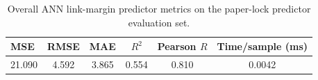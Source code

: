 \begin{table}[!t]
\centering
\caption{Overall ANN link-margin predictor metrics on the paper-lock predictor evaluation set.}
\label{tab:predictor_metrics}
\scriptsize
\begin{tabular}{lccccc}
\toprule
MSE & RMSE & MAE & $R^2$ & Pearson $R$ & Time/sample (ms) \\
\midrule
21.090 & 4.592 & 3.865 & 0.554 & 0.810 & 0.0042 \\
\bottomrule
\end{tabular}
\end{table}
